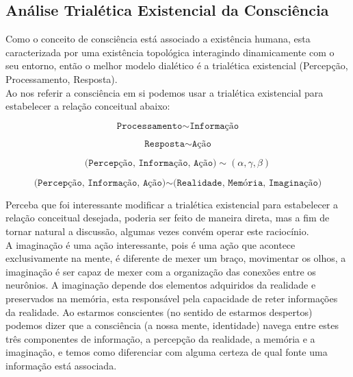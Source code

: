\documentclass[10pt,a4paper]{report}
\begin{document}
\subsection{Análise Trialética Existencial da Consciência}

\hspace{\baselineskip}

Como o conceito de consciência está associado a existência humana, esta caracterizada por uma existência topológica interagindo dinamicamente com o seu entorno, então o melhor modelo dialético é a trialética existencial (Percepção, Processamento, Resposta).\\

Ao nos referir a consciência em si podemos usar a trialética existencial para estabelecer a relação conceitual abaixo:

$$ \texttt{Processamento} \sim \texttt{Informação} $$

$$ \texttt{Resposta} \sim \texttt{Ação} $$

$$ \texttt{(Percepção, Informação, Ação)} \sim (\alpha, \gamma, \beta) $$

\hrulefill

$$ \texttt{(Percepção, Informação, Ação)} \sim \texttt{(Realidade, Memória, Imaginação)} $$

Perceba que foi interessante modificar a trialética existencial para estabelecer a relação conceitual desejada, poderia ser feito de maneira direta, mas a fim de tornar natural a discussão, algumas vezes convém operar este raciocínio.\\

A imaginação é uma ação interessante, pois é uma ação que acontece exclusivamente na mente, é diferente de mexer um braço, movimentar os olhos, a imaginação é ser capaz de mexer com a organização das conexões entre os neurônios. A imaginação depende dos elementos adquiridos da realidade e preservados na memória, esta responsável pela capacidade de reter informações da realidade. Ao estarmos conscientes (no sentido de estarmos despertos) podemos dizer que a consciência (a nossa mente, identidade) navega entre estes três componentes de informação, a percepção da realidade, a memória e a imaginação, e temos como diferenciar com alguma certeza de qual fonte uma informação está associada.\\
\end{document}

